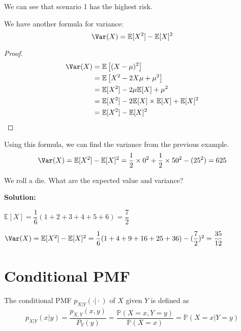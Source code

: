 We can see that scenario 1 has the highest risk. 

We have another formula for variance: 
\[
    \Var(X) = \mathbb{E}[X^2] - \mathbb{E}[X]^2
\]
\begin{proof}
    \[
        \begin{aligned}
            \Var(X) &= \mathbb{E}\left[(X - \mu)^2 \right] \\
            &= \mathbb{E}\left[X^2 -2 X \mu + \mu^2 \right] \\
            &= \mathbb{E}[X^2] -2\mu\mathbb{E}[X] + \mu^2 \\
            &= \mathbb{E}[X^2] - 2\mathbb{E}[X] \times \mathbb{E}[X] + \mathbb{E}[X]^2 \\
            &= \mathbb{E}[X^2] - \mathbb{E}[X]^2
        \end{aligned}
    \]
\end{proof}

Using this formula, we can find the variance from the previous example.
\[
\Var(X) = \mathbb{E}[X^2] - \mathbb{E}[X]^2 = \dfrac{1}{2} \times 0^2 + \dfrac{1}{2} \times 50^2 - (25^2) = 625
\] 

\begin{eg}
    We roll a die. What are the expected value and variance?

    \textbf{Solution:} 
    
    \(\mathbb{E}[X] = \dfrac{1}{6}(1 + 2 + 3 + 4 + 5 + 6) = \dfrac{7}{2}\)

    \(\Var(X) = \mathbb{E}[X^2] - \mathbb{E}[X]^2 = \dfrac{1}{6}(1 + 4 + 9 + 16 + 25 + 36) - (\dfrac{7}{2})^2 = \dfrac{35}{12}\)
\end{eg}

\newpage
\section{Conditional PMF}

\begin{definition}
The conditional PMF \(p_{X \vert Y} (\cdot\vert\cdot)\) of \(X\) given \(Y\) is defined as 
\[
    p_{X \vert Y} (x \vert y) = \dfrac{p_{X,Y}(x, y)}{P_Y (y)} = \dfrac{\mathbb{P}(X = x, Y = y)}{\mathbb{P}(X = x)} = \mathbb{P}(X = x \vert Y = y)
\]
\end{definition}

